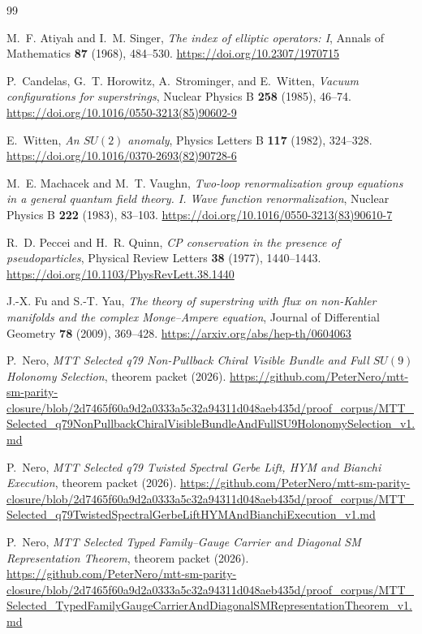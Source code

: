 \documentclass[11pt]{article}
\theoremstyle{plain}
\theoremstyle{definition}
\theoremstyle{remark}
\begin{document}
\begin{thebibliography}{99}

M.~F. Atiyah and I.~M. Singer,
\emph{The index of elliptic operators: I},
Annals of Mathematics \textbf{87} (1968), 484--530.
\url{https://doi.org/10.2307/1970715}

P.~Candelas, G.~T. Horowitz, A.~Strominger, and E.~Witten,
\emph{Vacuum configurations for superstrings},
Nuclear Physics B \textbf{258} (1985), 46--74.
\url{https://doi.org/10.1016/0550-3213(85)90602-9}

E.~Witten,
\emph{An $SU(2)$ anomaly},
Physics Letters B \textbf{117} (1982), 324--328.
\url{https://doi.org/10.1016/0370-2693(82)90728-6}

M.~E. Machacek and M.~T. Vaughn,
\emph{Two-loop renormalization group equations in a general quantum field
theory. I. Wave function renormalization},
Nuclear Physics B \textbf{222} (1983), 83--103.
\url{https://doi.org/10.1016/0550-3213(83)90610-7}

R.~D. Peccei and H.~R. Quinn,
\emph{CP conservation in the presence of pseudoparticles},
Physical Review Letters \textbf{38} (1977), 1440--1443.
\url{https://doi.org/10.1103/PhysRevLett.38.1440}

J.-X. Fu and S.-T. Yau,
\emph{The theory of superstring with flux on non-Kahler manifolds and the
complex Monge--Ampere equation},
Journal of Differential Geometry \textbf{78} (2009), 369--428.
\url{https://arxiv.org/abs/hep-th/0604063}

P.~Nero,
\emph{MTT Selected q79 Non-Pullback Chiral Visible Bundle and Full $SU(9)$
Holonomy Selection}, theorem packet (2026).
\url{https://github.com/PeterNero/mtt-sm-parity-closure/blob/2d7465f60a9d2a0333a5c32a94311d048aeb435d/proof_corpus/MTT_Selected_q79NonPullbackChiralVisibleBundleAndFullSU9HolonomySelection_v1.md}

P.~Nero,
\emph{MTT Selected q79 Twisted Spectral Gerbe Lift, HYM and Bianchi Execution},
theorem packet (2026).
\url{https://github.com/PeterNero/mtt-sm-parity-closure/blob/2d7465f60a9d2a0333a5c32a94311d048aeb435d/proof_corpus/MTT_Selected_q79TwistedSpectralGerbeLiftHYMAndBianchiExecution_v1.md}

P.~Nero,
\emph{MTT Selected Typed Family--Gauge Carrier and Diagonal SM Representation
Theorem}, theorem packet (2026).
\url{https://github.com/PeterNero/mtt-sm-parity-closure/blob/2d7465f60a9d2a0333a5c32a94311d048aeb435d/proof_corpus/MTT_Selected_TypedFamilyGaugeCarrierAndDiagonalSMRepresentationTheorem_v1.md}


\end{thebibliography}
\end{document}
